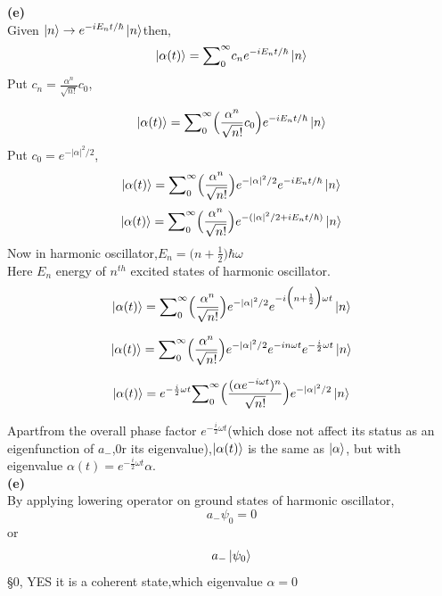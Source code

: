   \textbf{(e)} \\
  \hspace*{2cm} Given $\ket{n}\rightarrow e^{-iE_{n}t/{\hbar}}\ket{n} $then,
  $$\ket{\alpha(t)}={\sum}_{0}^{\infty}c_{n}e^{-iE_{n}t/{\hbar}}\ket{n}$$
  Put $c_{n}=\frac{{\alpha}^n}{\sqrt{n!}}c_{0}$,
  
  $$\ket{\alpha(t)}={\sum}_{0}^{\infty}\Big(\frac{{\alpha}^n}{\sqrt{n!}}c_{0}\Big)e^{-iE_{n}t/{\hbar}}\ket{n}$$
  Put ${c_{0}}= {e}^{{-{|\alpha|}^2}/{2}}$,
  $$\ket{\alpha(t)}={\sum}_{0}^{\infty}\Big(\frac{{\alpha}^n}{\sqrt{n!}}\Big){e}^{{-{|\alpha|}^2}/{2}}e^{-iE_{n}t/{\hbar}}\ket{n}$$
  $$\ket{\alpha(t)}={\sum}_{0}^{\infty}\Big(\frac{{\alpha}^n}{\sqrt{n!}}\Big)e^{-({{|\alpha|}^2}/{2}+iE_{n}t/{\hbar})}\ket{n}$$
  Now in harmonic oscillator,$E_{n}=\Big(n+\frac{1}{2}\Big)\hbar\omega$\\
  Here $E_{n}$ energy of $n^{th}$ excited states of harmonic oscillator.\\
   $$\ket{\alpha(t)}={\sum}_{0}^{\infty}\Big(\frac{{\alpha}^n}{\sqrt{n!}}\Big){e}^{{-{|\alpha|}^2}/{2}}e^{-i{\Big(n+\frac{1}{2}\Big)\omega}t}\ket{n}$$
  
     $$\ket{\alpha(t)}={\sum}_{0}^{\infty}\Big(\frac{{\alpha}^n}{\sqrt{n!}}\Big){e}^{{-{|\alpha|}^2}/{2}}e^{-i{n\omega}t}e^{-\frac{i}{2}{\omega}t}\ket{n}$$
  
     $$\ket{\alpha(t)}=e^{-\frac{i}{2}{\omega}t}{\sum}_{0}^{\infty}\Big(\frac{({\alpha{e^{-i{\omega}t}}})^n}{\sqrt{n!}}\Big){e}^{{-{|\alpha|}^2}/{2}}\ket{n}$$
  
  Apartfrom the overall phase factor $e^{-\frac{i}{2}{\omega}t}$(which dose not affect  its status as an eigenfunction of $a_{-}$,0r its eigenvalue),$\ket{\alpha(t)}$ is the same as $\ket{\alpha}$, but with eigenvalue $\alpha(t)=e^{-\frac{i}{2}{\omega}t}\alpha$.\\
  
  \textbf{(e)} \\
  \hspace*{2cm} By applying lowering operator on ground states of harmonic oscillator,\\
 $$a_{-}{\psi}_{0}=0$$ or$$a_{-}\ket{{\psi}_{0}}$$\S0, YES it is a coherent state,which eigenvalue $\alpha=0$